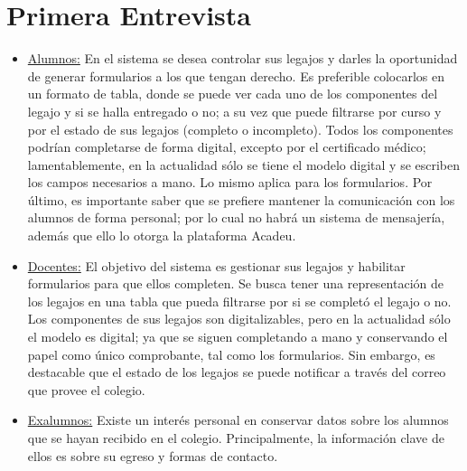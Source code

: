 \section{Primera Entrevista}
\begin{itemize}
  \item \underline{Alumnos:} En el sistema se desea controlar
  sus legajos y darles la oportunidad de generar formularios a
  los que tengan derecho. Es preferible colocarlos en un formato 
  de tabla, donde se puede ver cada uno de los componentes del
  legajo y si se halla entregado o no; a su vez que puede
  filtrarse por curso y por el estado de sus legajos (completo o
  incompleto). Todos los componentes podrían completarse de forma
  digital, excepto por el certificado médico; lamentablemente, en
  la actualidad sólo se tiene el modelo digital y se escriben los
  campos necesarios a mano. Lo mismo aplica para los formularios.
  Por último, es importante saber que se prefiere mantener la
  comunicación con los alumnos de forma personal; por lo cual no
  habrá un sistema de mensajería, además que ello lo otorga la
  plataforma Acadeu.
  \item \underline{Docentes:} El objetivo del sistema es gestionar
  sus legajos y habilitar formularios para que ellos completen.
  Se busca tener una representación de los legajos en una tabla
  que pueda filtrarse por si se completó el legajo o no. Los
  componentes de sus legajos son digitalizables, pero en la
  actualidad sólo el modelo es digital; ya que se siguen
  completando a mano y conservando el papel como único comprobante,
  tal como los formularios. Sin embargo, es destacable que el
  estado de los legajos se puede notificar a través del correo
  que provee el colegio.
  \item \underline{Exalumnos:} Existe un interés personal en conservar
  datos sobre los alumnos que se hayan recibido en el colegio.
  Principalmente, la información clave de ellos es sobre su egreso y
  formas de contacto.
\end{itemize}
